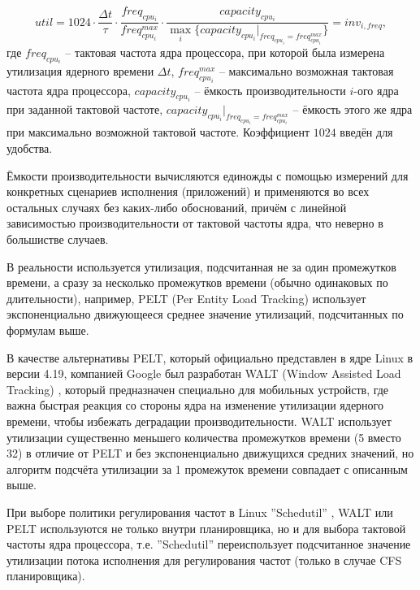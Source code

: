     \begin{equation} \label{util_linux_formula}
        util = 1024 \cdot \frac{\Delta t}{\tau} \cdot \frac{freq_{cpu_{i}}}{freq^{max}_{cpu_{i}}} \cdot
               \frac{capacity_{cpu_{i}}}{\max_i \{capacity_{cpu_{i}} |_{freq_{cpu_i} = freq_{cpu_i}^{max}}\}} =
            inv_{i, freq},
    \end{equation}
    где $freq_{cpu_{i}}$ -- тактовая частота ядра процессора, при которой была измерена утилизация
    ядерного времени $\Delta t$, $freq^{max}_{cpu_{i}}$ -- максимально возможная тактовая частота ядра
    процессора, $capacity_{cpu_{i}}$ -- ёмкость производительности $i$-ого ядра при заданной
    тактовой частоте, $capacity_{cpu_{i}} |_{freq_{cpu_i} = freq_{cpu_i}^{max}}$ -- ёмкость этого
    же ядра при максимально возможной тактовой частоте. Коэффициент $1024$ введён для удобства.

    Ёмкости производительности вычисляются единожды с помощью измерений для конкретных сценариев
    исполнения (приложений) и применяются во всех остальных случаях без каких-либо обоснований,
    причём с линейной зависимостью производительности от тактовой частоты ядра, что неверно
    в большистве случаев.

    В реальности используется утилизация, подсчитанная не за один промежутков времени, а сразу за
    несколько промежутков времени (обычно одинаковых по длительности), например, PELT
    (Per Entity Load Tracking) \cite{KernelDocsSchedutil} использует экспоненциально движующееся
    среднее значение утилизаций, подсчитанных по формулам выше.

    В качестве альтернативы PELT, который официально представлен в ядре Linux в версии 4.19,
    компанией Google был разработан WALT (Window Assisted Load Tracking) \cite{QualcommWALT},
    который предназначен специально для мобильных устройств, где важна быстрая реакция со стороны ядра
    на изменение утилизации ядерного времени, чтобы избежать деградации производительности.
    WALT использует утилизации существенно меньшего количества промежутков времени (5 вместо 32) в
    отличие от PELT и без экспоненциально движущихся средних значений, но алгоритм подсчёта утилизации
    за 1 промежуток времени совпадает с описанным выше.

    При выборе политики регулирования частот в Linux ''Schedutil'' \cite{KernelDocsSchedutil},
    WALT или PELT используются не только внутри планировщика, но и для выбора тактовой частоты ядра
    процессора, т.е. ''Schedutil'' переиспользует подсчитанное значение утилизации потока исполнения
    для регулирования частот (только в случае CFS планировщика).

